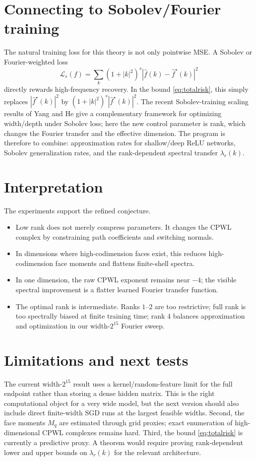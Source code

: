 \documentclass[10pt,twocolumn]{article}
\newcommand{\1}{\mathbf{1}}
\newcommand{\wh}{\widehat}
\begin{document}
\section{Connecting to Sobolev/Fourier training}
The natural training loss for this theory is not only pointwise MSE.  A Sobolev or Fourier-weighted loss
\begin{equation}
\mathcal{L}_{s}(f)=\sum_k (1+|k|^2)^s |\wh f(k)-\wh f^\star(k)|^2
\end{equation}
directly rewards high-frequency recovery.  In the bound \eqref{eq:totalrisk}, this simply replaces $|\wh f^\star(k)|^2$ by $(1+|k|^2)^s|\wh f^\star(k)|^2$.  The recent Sobolev-training scaling results of Yang and He give a complementary framework for optimizing width/depth under Sobolev loss; here the new control parameter is rank, which changes the Fourier transfer and the effective dimension.  The program is therefore to combine: approximation rates for shallow/deep ReLU networks, Sobolev generalization rates, and the rank-dependent spectral transfer $\lambda_r(k)$.

\section{Interpretation}
The experiments support the refined conjecture.
\begin{itemize}[leftmargin=1.2em,itemsep=1pt,topsep=2pt]
\item Low rank does not merely compress parameters.  It changes the CPWL complex by constraining path coefficients and switching normals.
\item In dimensions where high-codimension faces exist, this reduces high-codimension face moments and flattens finite-shell spectra.
\item In one dimension, the raw CPWL exponent remains near $-4$; the visible spectral improvement is a flatter learned Fourier transfer function.
\item The optimal rank is intermediate.  Ranks $1$--$2$ are too restrictive; full rank is too spectrally biased at finite training time; rank $4$ balances approximation and optimization in our width-$2^{15}$ Fourier sweep.
\end{itemize}

\section{Limitations and next tests}
The current width-$2^{15}$ result uses a kernel/random-feature limit for the full endpoint rather than storing a dense hidden matrix.  This is the right computational object for a very wide model, but the next version should also include direct finite-width SGD runs at the largest feasible widths.  Second, the face moments $M_q$ are estimated through grid proxies; exact enumeration of high-dimensional CPWL complexes remains hard.  Third, the bound \eqref{eq:totalrisk} is currently a predictive proxy.  A theorem would require proving rank-dependent lower and upper bounds on $\lambda_r(k)$ for the relevant architecture.
\end{document}
